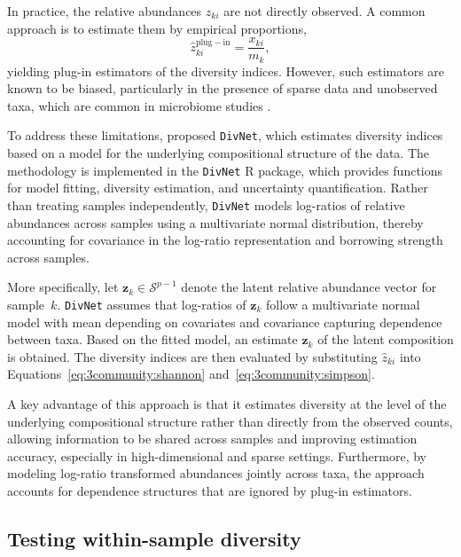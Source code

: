 In practice, the relative abundances $z_{ki}$ are not directly observed. A common approach is to estimate them by empirical proportions,
\begin{equation}
\hat{z}_{ki}^{\mathrm{plug-in}} = \frac{x_{ki}}{m_k},
\end{equation}
yielding plug-in estimators of the diversity indices. However, such estimators are known to be biased, particularly in the presence of sparse data and unobserved taxa, which are common in microbiome studies \citep{willis2018divnet}.

To address these limitations, \citet{willis2018divnet} proposed \texttt{DivNet}, which estimates diversity indices based on a model for the underlying compositional structure of the data. The methodology is implemented in the \texttt{DivNet} R package, which provides functions for model fitting, diversity estimation, and uncertainty quantification. Rather than treating samples independently, \texttt{DivNet} models log-ratios of relative abundances across samples using a multivariate normal distribution, thereby accounting for covariance in the log-ratio representation and borrowing strength across samples.

More specifically, let $\mathbf{z}_k \in \mathcal{S}^{p-1}$ denote the latent relative abundance vector for sample~$k$. \texttt{DivNet} assumes that log-ratios of $\mathbf{z}_k$ follow a multivariate normal model with mean depending on covariates and covariance capturing dependence between taxa. Based on the fitted model, an estimate $\hat{\mathbf{z}}_k$ of the latent composition is obtained. The diversity indices are then evaluated by substituting $\hat{z}_{ki}$ into Equations~\eqref{eq:3community:shannon} and~\eqref{eq:3community:simpson}.

A key advantage of this approach is that it estimates diversity at the level of the underlying compositional structure rather than directly from the observed counts, allowing information to be shared across samples and improving estimation accuracy, especially in high-dimensional and sparse settings. Furthermore, by modeling log-ratio transformed abundances jointly across taxa, the approach accounts for dependence structures that are ignored by plug-in estimators.

\subsection{Testing within-sample diversity}
\label{sec:3community:within:testing}

